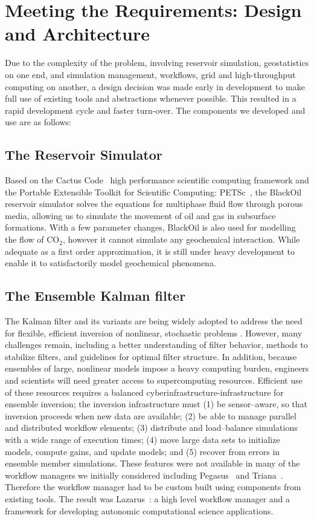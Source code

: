 \documentclass{acm_proc_article-sp}
\begin{document}
\section{Meeting the Requirements: Design and Architecture}

Due to the complexity of the problem, involving reservoir simulation,
geostatistics on one end, and simulation management, workflows, grid
and high-throughput computing on another, a design decision was made
early in development to make full use of existing tools and
abstractions whenever possible. This resulted in a rapid development
cycle and faster turn-over. The components we developed and use are as
follows:

\subsection{The Reservoir Simulator} 

Based on the Cactus Code~\cite{cactus_web} high performance
scientific computing framework and the Portable Extensible Toolkit for
Scientific Computing: PETSc~\cite{PETSc}, the BlackOil reservoir
simulator solves the equations for multiphase fluid flow through
porous media, allowing us to simulate the movement of oil and gas in
subsurface formations. With a few parameter changes, BlackOil is also
used for modelling the flow of CO$_2$, however it cannot simulate any
geochemical interaction. While adequate as a first order
approximation, it is still under heavy development to enable it to
satisfactorily model geochemical phenomena.

\subsection{The Ensemble Kalman filter} 

The Kalman filter and its variants are being widely adopted to address
the need for flexible, efficient inversion of nonlinear, stochastic
problems \cite{DataAssim}. However, many challenges remain,
including a better understanding of filter behavior, methods to
stabilize filters, and guidelines for optimal filter structure. In
addition, because ensembles of large, nonlinear models impose a heavy
computing burden, engineers and scientists will need greater access to
supercomputing resources. Efficient use of these resources requires a
balanced cyberinfrastructure-infrastructure for ensemble inversion; the inversion
infrastructure must (1) be sensor--aware, so that inversion proceeds
when new data are available; (2) be able to manage parallel and
distributed workflow elements; (3) distribute and load--balance
simulations with a wide range of execution times; (4) move large data
sets to initialize models, compute gains, and update models; and (5)
recover from errors in ensemble member simulations. These features
were not available in many of the workflow managers we initially considered
including Pegasus~\cite{Pegasus} and Triana~\cite{Triana}. Therefore
the workflow manager had to be custom built using components from existing
tools. The result was Lazarus~\cite{gmac}: a high level workflow manager
and a framework for developing autonomic computational science applications.
\end{document}
